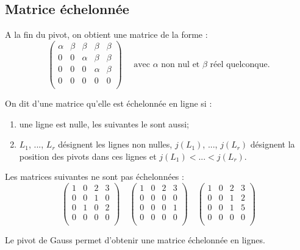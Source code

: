 \documentclass[10pt]{article}
\begin{document}
\subsection{Matrice échelonnée}
A la fin du pivot, on obtient une matrice de la forme :
$$
\begin{pmatrix}
\alpha &\beta & \beta & \beta & \beta \\
0 & 0 & \alpha & \beta  &  \beta \\
0 & 0 & 0 &  \alpha& \beta \\
0 & 0 & 0 & 0 &  0\\
\end{pmatrix}
\quad 
\text{ avec }\alpha \text{ non nul et }\beta \text{ réel quelconque.}
$$

\begin{defi}
On dit d'une matrice qu'elle est échelonnée en ligne si :
\begin{enumerate}
\item une ligne est nulle, les suivantes le sont aussi;
\item $L_1$, ..., $L_r$ désignent les lignes non nulles, $j(L_1)$, ..., $j(L_r)$ désignent la position des pivots dans ces lignes et $j(L_1)<...<j(L_r)$. 
\end{enumerate}
\end{defi}

\begin{exemple}
Les matrices suivantes ne sont pas échelonnées : 
$$
\begin{pmatrix}
1 & 0 & 2 & 3\\
0 & 0 & 1 & 0\\
0 & 1 & 0 & 2\\
0 & 0 & 0 & 0\\
\end{pmatrix}
\quad
\begin{pmatrix}
1 & 0 & 2 & 3\\
0 & 0 & 0 & 0\\
0 & 0 & 0 & 1\\
0 & 0 & 0 & 0\\
\end{pmatrix}
\quad
\begin{pmatrix}
1 & 0 & 2 & 3\\
0 & 0 & 1 & 2\\
0 & 0 & 1 & 5\\
0 & 0 & 0 & 0\\
\end{pmatrix}
$$
\end{exemple}

\begin{prop}
Le pivot de Gauss permet d'obtenir une matrice échelonnée en lignes. 
\end{prop}
\end{document}
